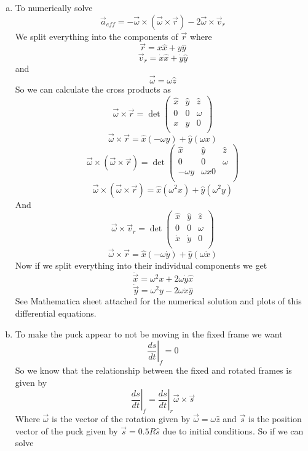 \documentclass[11pt]{article}
\numberwithin{equation}{section}
\begin{document}
\begin{enumerate}[(a)]
\item
To numerically solve 
$$\vec{a}_{eff} = -\vec{\omega}\times(\vec{\omega}\times\vec{r})-2\vec{\omega}\times\vec{v}_r$$
We split everything into the components of $\vec{r}$ where
$$\vec{r}=x\hat{x}+y\hat{y}$$
$$\vec{v}_r=\dot{x}\hat{x}+\dot{y}\hat{y}$$
and 
$$\vec{\omega} = \omega\hat{z}$$
So we can calculate the cross products as
$$\vec{\omega}\times\vec{r} = \det\left(\begin{array}{ccc}
			\hat{x}		&\hat{y}	&\hat{z}\\		
			0		&0		&\omega\\
			x		&y		&0\\
				\end{array}\right)$$
$$\vec{\omega}\times\vec{r} = \hat{x}(-\omega y)+\hat{y}(\omega x)$$
$$\vec{\omega}\times(\vec{\omega}\times\vec{r})= \det\left(\begin{array}{ccc}
			\hat{x}		&\hat{y}	&\hat{z}\\		
			0		&0		&\omega\\
			-\omega y	&\omega x 	0\\
				\end{array}\right)$$
$$\vec{\omega}\times(\vec{\omega}\times\vec{r})= \hat{x}(\omega^2 x)+\hat{y}(\omega^2y)$$
And 
$$\vec{\omega}\times\vec{v}_r = \det\left(\begin{array}{ccc}
			\hat{x}		&\hat{y}	&\hat{z}\\		
			0		&0		&\omega\\
			\dot{x}		&\dot{y}	&0\\
					\end{array}\right)$$
$$\vec{\omega}\times\vec{r} = \hat{x}(-\omega \dot{y})+\hat{y}(\omega \dot{x})$$
Now if we split everything into their individual components we get
$$\ddot{\vec{x}} = \omega^2x+2\omega\dot{y}\hat{x}$$
$$\ddot{\vec{y}} = \omega^2y-2\omega\dot{x}\hat{y}$$
See Mathematica sheet attached for the numerical solution and plots of this differential equations.
\item
To make the puck appear to not be moving in the fixed frame we want
$$\left.\frac{ds}{dt}\right|_f = 0$$
So we know that the relationship between the fixed and rotated frames is given by
$$\left.\frac{ds}{dt}\right|_f = \left.\frac{ds}{dt}\right|_r \vec{\omega}\times\vec{s}$$
Where $\vec{\omega}$ is the vector of the rotation given by $\vec{\omega} = \omega\hat{z}$ and $\vec{s}$ is the position vector of the puck given by $\vec{s}=0.5R\hat{s}$ due to initial conditions. So if we can solve

\end{enumerate}
\end{document}
